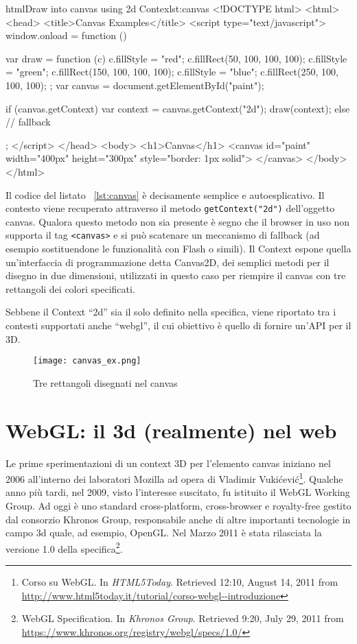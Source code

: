 \begin{mylisting}{html}{Draw into canvas using 2d Contex}{lst:canvas}
<!DOCTYPE html>
<html>
<head>
<title>Canvas Examples</title>
<script type="text/javascript">
window.onload = function () {
    var draw = function (c) {
        c.fillStyle = "red";
        c.fillRect(50, 100, 100, 100);
        c.fillStyle = "green";
        c.fillRect(150, 100, 100, 100);
        c.fillStyle = "blue";
        c.fillRect(250, 100, 100, 100);        
    };
    var canvas = document.getElementById("paint");

    if (canvas.getContext) {
        var context = canvas.getContext("2d");
        draw(context);
    } else {
        // fallback
    }
};    
</script>
</head>
<body>
    <h1>Canvas</h1>
    <canvas id="paint" width="400px" height="300px" style="border: 1px solid"> 
    </canvas>
</body>
</html>
\end{mylisting}

Il codice del listato ~\ref{lst:canvas} è decisamente semplice e autoesplicativo. Il contesto viene recuperato attraverso il metodo \texttt{getContext("2d")} dell'oggetto canvas. Qualora questo metodo non sia presente è segno che il browser in uso non supporta il tag \texttt{<canvas>} e si può scatenare un meccanismo di fallback (ad esempio sostituendone le funzionalità con Flash o simili). Il Context espone quella un'interfaccia di programmazione detta Canvas2D, dei semplici metodi per il disegno in due dimensioni, utilizzati in questo caso per riempire il canvas con tre rettangoli dei colori specificati.

Sebbene il Context ``2d'' sia il solo definito nella specifica, viene riportato tra i contesti supportati anche ``webgl'', il cui obiettivo è quello di fornire un'API per il 3D.

\begin{figure}[Ht]
\centering
\texttt{[image: canvas\_ex.png]}
\caption{Tre rettangoli disegnati nel canvas}
\label{label:canvasex}
\end{figure}
\clearpage

\section{WebGL: il 3d (realmente) nel web}
Le prime sperimentazioni di un context 3D per l'elemento canvas iniziano nel 2006 all'interno dei laboratori Mozilla ad opera di Vladimir Vukićević\footnote{Corso su WebGL. In \textit{HTML5Today}. Retrieved 12:10, August 14, 2011 from \url{http://www.html5today.it/tutorial/corso-webgl--introduzione}}. Qualche anno più tardi, nel 2009, visto l'interesse suscitato, fu istituito il \mbox{WebGL} Working Group. Ad oggi è uno standard cross-platform, cross-browser e royalty-free gestito dal consorzio Khronos Group, responsabile anche di altre importanti tecnologie in campo 3d quale, ad esempio, OpenGL. Nel Marzo 2011 è stata rilasciata la versione 1.0 della specifica\footnote{WebGL Specification. In \textit{Khronos Group}. Retrieved 9:20, July 29, 2011 from \url{https://www.khronos.org/registry/webgl/specs/1.0/}}.

